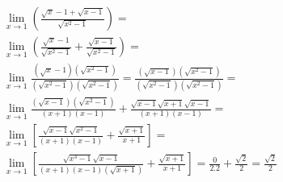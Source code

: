 \begin{ex}
\begin{align}
&\lim_{x\rightarrow 1} \left(\frac{\sqrt{x}-1+\sqrt{x-1}}{\sqrt{x^2-1}}\right)=\nonumber\\
&\lim_{x\rightarrow 1} \left(\frac{\sqrt{x}-1}{\sqrt{x^2-1}}+\frac{\sqrt{x-1}}{\sqrt{x^2-1}}\right)=\nonumber\\
&\lim_{x\rightarrow 1} \frac{(\sqrt{x}-1)(\sqrt{x^2-1})}{(\sqrt{x^2-1})(\sqrt{x^2-1})}=\frac{(\sqrt{x-1})(\sqrt{x^2-1})}{(\sqrt{x^2-1})(\sqrt{x^2-1})}=\nonumber\\
&\lim_{x\rightarrow 1} \frac{(\sqrt{x-1})(\sqrt{x^2-1})}{(x+1)(x-1)}+\frac{\sqrt{x-1}\sqrt{x+1}\sqrt{x-1}}{(x+1)(x-1)}=\nonumber\\
&\lim_{x\rightarrow 1} \left[\frac{\sqrt{x-1}\sqrt{x^2-1}}{(x+1)(x-1)}+\frac{\sqrt{x+1}}{x+1}\right]=\nonumber\\
&\lim_{x\rightarrow 1} \left[\frac{\sqrt{x^3-1}\sqrt{x-1}}{(x+1)(x-1)(\sqrt{x+1})}+\frac{\sqrt{x+1}}{x+1}\right]=
\frac{0}{2.2}+\frac{\sqrt{2}}{2}=\frac{\sqrt{2}}{2}\nonumber
\end{align}
\end{ex}